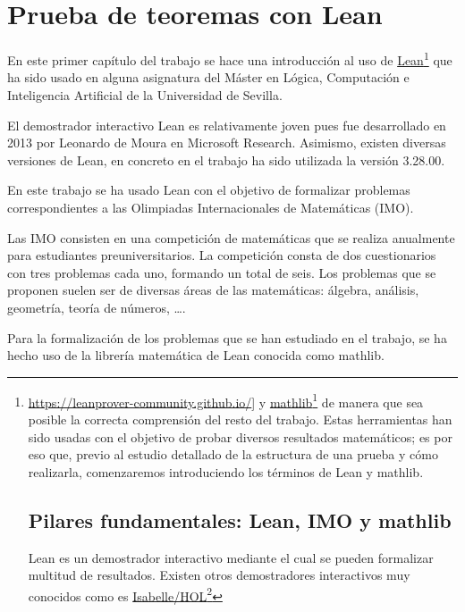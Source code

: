 \chapter{Prueba de teoremas con Lean}

En este primer capítulo del trabajo se hace una introducción al uso de
\href{https://leanprover-community.github.io/}{Lean}\footnote{\url{https://leanprover-community.github.io/}] y
\href{https://leanprover-community.github.io/mathlib_docs/}{mathlib}\footnote{\url{https://leanprover-community.github.io/mathlib_docs/}}
de manera que sea posible la correcta comprensión del resto del
trabajo. Estas herramientas han sido usadas con el objetivo de probar
diversos resultados matemáticos; es por eso que, previo al estudio
detallado de la estructura de una prueba y cómo realizarla, comenzaremos
introduciendo los términos de Lean y mathlib.

\section{Pilares fundamentales: Lean, IMO y mathlib}

Lean es un demostrador interactivo mediante el cual se pueden formalizar
multitud de resultados. Existen otros demostradores interactivos muy
conocidos como es
\href{https://www.cl.cam.ac.uk/research/hvg/Isabelle/index.html}{Isabelle/HOL}\footnote{https://www.cl.cam.ac.uk/research/hvg/Isabelle}}
que ha sido usado en alguna asignatura
del Máster en Lógica, Computación e Inteligencia Artificial de la
Universidad de Sevilla.

El demostrador interactivo Lean es relativamente joven pues fue
desarrollado en 2013 por Leonardo de Moura en Microsoft
Research. Asimismo, existen diversas versiones de Lean, en concreto en
el trabajo ha sido utilizada la versión 3.28.00.

En este trabajo se ha usado Lean con el objetivo de formalizar problemas
correspondientes a las Olimpiadas Internacionales de Matemáticas (IMO).

Las IMO consisten en una competición de matemáticas que se realiza
anualmente para estudiantes preuniversitarios. La competición consta de
dos cuestionarios con tres problemas cada uno, formando un total de
seis. Los problemas que se proponen suelen ser de diversas áreas de las
matemáticas: álgebra, análisis, geometría, teoría de números, \dots.

Para la formalización de los problemas que se han estudiado en el
trabajo, se ha hecho uso de la librería matemática de Lean conocida como
mathlib.


